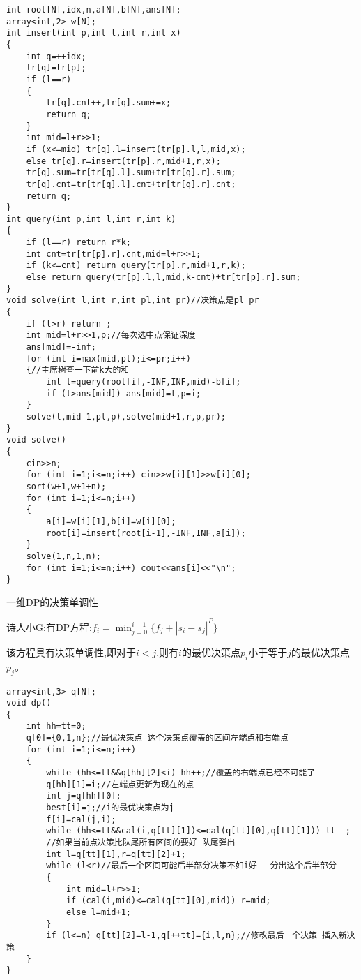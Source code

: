 \documentclass[a4paper]{ctexart}
\begin{document}
\begin{lstlisting}
int root[N],idx,n,a[N],b[N],ans[N];
array<int,2> w[N];
int insert(int p,int l,int r,int x)
{
    int q=++idx;
    tr[q]=tr[p];
    if (l==r)
    {
        tr[q].cnt++,tr[q].sum+=x;
        return q;
    }
    int mid=l+r>>1;
    if (x<=mid) tr[q].l=insert(tr[p].l,l,mid,x);
    else tr[q].r=insert(tr[p].r,mid+1,r,x);
    tr[q].sum=tr[tr[q].l].sum+tr[tr[q].r].sum;
    tr[q].cnt=tr[tr[q].l].cnt+tr[tr[q].r].cnt;
    return q;
}
int query(int p,int l,int r,int k)
{
    if (l==r) return r*k;
    int cnt=tr[tr[p].r].cnt,mid=l+r>>1;
    if (k<=cnt) return query(tr[p].r,mid+1,r,k);
    else return query(tr[p].l,l,mid,k-cnt)+tr[tr[p].r].sum;
}
void solve(int l,int r,int pl,int pr)//决策点是pl pr
{
    if (l>r) return ;
    int mid=l+r>>1,p;//每次选中点保证深度
    ans[mid]=-inf;
    for (int i=max(mid,pl);i<=pr;i++)
    {//主席树查一下前k大的和
        int t=query(root[i],-INF,INF,mid)-b[i];
        if (t>ans[mid]) ans[mid]=t,p=i;
    }
    solve(l,mid-1,pl,p),solve(mid+1,r,p,pr);
}
void solve()
{
    cin>>n;
    for (int i=1;i<=n;i++) cin>>w[i][1]>>w[i][0];
    sort(w+1,w+1+n);
    for (int i=1;i<=n;i++)
    {
        a[i]=w[i][1],b[i]=w[i][0];
        root[i]=insert(root[i-1],-INF,INF,a[i]);
    }
    solve(1,n,1,n);
    for (int i=1;i<=n;i++) cout<<ans[i]<<"\n";
}
\end{lstlisting}

一维DP的决策单调性

诗人小G:有DP方程:$f_i=\min_{j=0}^{i-1}\{f_j+|s_i-s_j|^P\}$

该方程具有决策单调性,即对于$i<j$,则有$i$的最优决策点$p_i$小于等于$j$的最优决策点$p_j$。

\begin{lstlisting}
array<int,3> q[N];
void dp()
{
    int hh=tt=0;
    q[0]={0,1,n};//最优决策点 这个决策点覆盖的区间左端点和右端点
    for (int i=1;i<=n;i++)
    {
        while (hh<=tt&&q[hh][2]<i) hh++;//覆盖的右端点已经不可能了
        q[hh][1]=i;//左端点更新为现在的点
        int j=q[hh][0];
        best[i]=j;//i的最优决策点为j
        f[i]=cal(j,i);
        while (hh<=tt&&cal(i,q[tt][1])<=cal(q[tt][0],q[tt][1])) tt--;
        //如果当前点决策比队尾所有区间的要好 队尾弹出
        int l=q[tt][1],r=q[tt][2]+1;
        while (l<r)//最后一个区间可能后半部分决策不如i好 二分出这个后半部分
        {
            int mid=l+r>>1;
            if (cal(i,mid)<=cal(q[tt][0],mid)) r=mid;
            else l=mid+1;
        }
        if (l<=n) q[tt][2]=l-1,q[++tt]={i,l,n};//修改最后一个决策 插入新决策
    }
}
\end{lstlisting}
\end{document}
